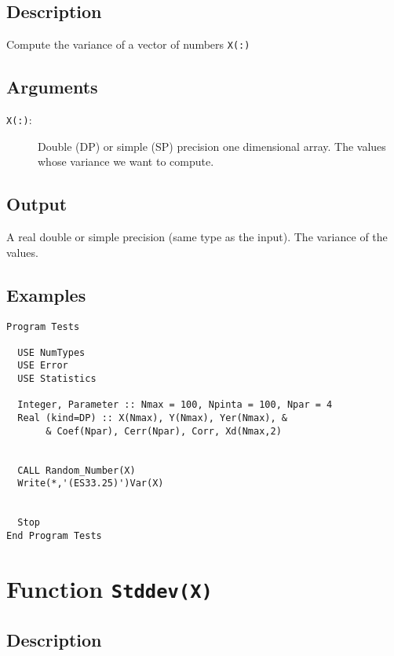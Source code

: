 \subsection{Description}

Compute the variance of a vector of numbers \texttt{X(:)}

\subsection{Arguments}

\begin{description}
\item[\texttt{X(:)}:] Double (DP) or simple (SP) precision one
  dimensional array. The values  whose variance we want to compute.
\end{description}

\subsection{Output}

A real double or simple precision (same type as the input). The
variance of the values.

\subsection{Examples}

\begin{lstlisting}[emph=Var,
                   emphstyle=\color{blue},
                   frame=trBL,
                   caption=Computing the Variance of a set of numbers.,
                   label=var]
Program Tests

  USE NumTypes
  USE Error
  USE Statistics

  Integer, Parameter :: Nmax = 100, Npinta = 100, Npar = 4
  Real (kind=DP) :: X(Nmax), Y(Nmax), Yer(Nmax), &
       & Coef(Npar), Cerr(Npar), Corr, Xd(Nmax,2)


  CALL Random_Number(X)
  Write(*,'(ES33.25)')Var(X)


  Stop
End Program Tests
\end{lstlisting}


\section{Function \texttt{Stddev(X)}}

\subsection{Description}

